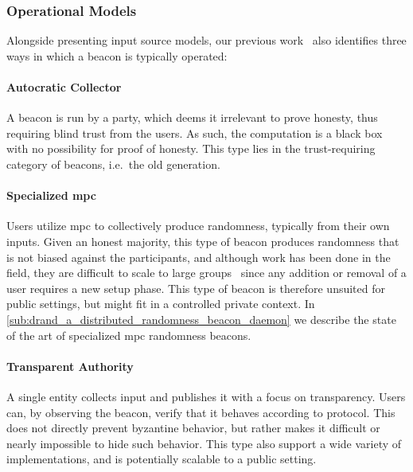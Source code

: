 \subsubsection{Operational Models}
Alongside presenting input source models, our previous work~\cite{worldsbestpaper} also identifies three ways in which a beacon is typically operated:

\paragraph{Autocratic Collector}
A beacon is run by a party, which deems it irrelevant to prove honesty, thus requiring blind trust from the users.
As such, the computation is a black box with no possibility for proof of honesty.
This type lies in the trust-requiring category of beacons, i.e.\ the old generation.

\paragraph{Specialized \acrshort{mpc}}
Users utilize \acrfull{mpc} to collectively produce randomness, typically from their own inputs.
Given an honest majority, this type of beacon produces randomness that is not biased against the participants, and although work has been done in the field, they are difficult to scale to large groups~\cite{cascudo2017scrape, syta2017scalable} since any addition or removal of a user requires a new setup phase.
This type of beacon is therefore unsuited for public settings, but might fit in a controlled private context.
In \vref{sub:drand_a_distributed_randomness_beacon_daemon} we describe the state of the art of specialized \gls{mpc} randomness beacons.

\paragraph{Transparent Authority}
A single entity collects input and publishes it with a focus on transparency.
Users can, by observing the beacon, verify that it behaves according to protocol.
This does not directly prevent byzantine behavior, but rather makes it difficult or nearly impossible to hide such behavior.
This type also support a wide variety of implementations, and is potentially scalable to a public setting.
